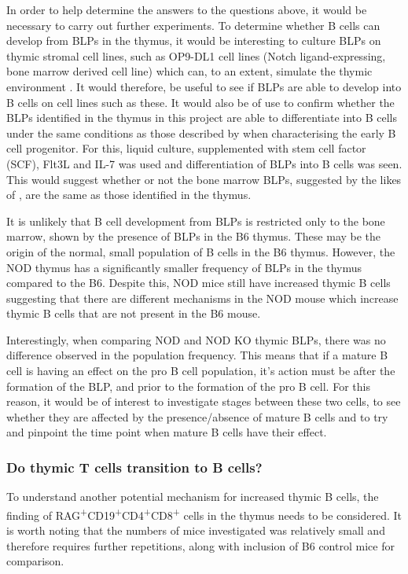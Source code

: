 In order to help determine the answers to the questions above, it would be necessary to carry out further experiments.
To determine whether B cells can develop from BLPs in the thymus, it would be interesting to culture BLPs on thymic stromal cell lines, such as OP9-DL1 cell lines (Notch ligand-expressing, bone marrow derived cell line) which can, to an extent, simulate the thymic environment \citep{Holmes2009}.
It would therefore, be useful to see if BLPs are able to develop into B cells on cell lines such as these.
It would also be of use to confirm whether the BLPs identified in the thymus in this project are able to differentiate into B cells under the same conditions as those described by \citet{Inlay2009} when characterising the early B cell progenitor.
For this, liquid culture, supplemented with stem cell factor (SCF), Flt3L and IL-7 was used and differentiation of BLPs into B cells was seen.
This would suggest whether or not the bone marrow BLPs, suggested by the likes of \citet{Inlay2009}, are the same as those identified in the thymus.

It is unlikely that B cell development from BLPs is restricted only to the bone marrow, shown by the presence of BLPs in the B6 thymus.
These may be the origin of the normal, small population of B cells in the B6 thymus.
However, the NOD thymus has a significantly smaller frequency of BLPs in the thymus compared to the B6.
Despite this, NOD mice still have increased thymic B cells suggesting that there are different mechanisms in the NOD mouse which increase thymic B cells that are not present in the B6 mouse.

Interestingly, when comparing NOD and NOD KO thymic BLPs, there was no difference observed in the population frequency.
This means that if a mature B cell is having an effect on the pro B cell population, it's action must be after the formation of the BLP, and prior to the formation of the pro B cell.
For this reason, it would be of interest to investigate stages between these two cells, to see whether they are affected by the presence/absence of mature B cells and to try and pinpoint the time point when mature B cells have their effect.

\subsubsection{Do thymic T cells transition to B cells?}

To understand another potential mechanism for increased thymic B cells, the finding of RAG\textsuperscript{+}CD19\textsuperscript{+}CD4\textsuperscript{+}CD8\textsuperscript{+} cells in the thymus needs to be considered.
It is worth noting that the numbers of mice investigated was relatively small and therefore requires further repetitions, along with inclusion of B6 control mice for comparison.

